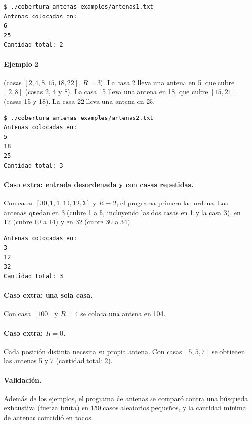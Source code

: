\documentclass[11pt,a4paper]{article}
\begin{document}
\begin{verbatim}
$ ./cobertura_antenas examples/antenas1.txt
Antenas colocadas en:
6
25
Cantidad total: 2
\end{verbatim}

\paragraph{Ejemplo 2} (casas $[2, 4, 8, 15, 18, 22]$, $R = 3$). La casa 2 lleva una antena en 5, que cubre $[2, 8]$ (casas 2, 4 y 8). La casa 15 lleva una antena en 18, que cubre $[15, 21]$ (casas 15 y 18). La casa 22 lleva una antena en 25.

\begin{verbatim}
$ ./cobertura_antenas examples/antenas2.txt
Antenas colocadas en:
5
18
25
Cantidad total: 3
\end{verbatim}

\paragraph{Caso extra: entrada desordenada y con casas repetidas.} Con casas $[30, 1, 1, 10, 12, 3]$ y $R = 2$, el programa primero las ordena. Las antenas quedan en 3 (cubre 1 a 5, incluyendo las dos casas en 1 y la casa 3), en 12 (cubre 10 a 14) y en 32 (cubre 30 a 34).

\begin{verbatim}
Antenas colocadas en:
3
12
32
Cantidad total: 3
\end{verbatim}

\paragraph{Caso extra: una sola casa.} Con casa $[100]$ y $R = 4$ se coloca una antena en 104.

\paragraph{Caso extra: $R = 0$.} Cada posición distinta necesita su propia antena. Con casas $[5, 5, 7]$ se obtienen las antenas 5 y 7 (cantidad total: 2).

\paragraph{Validación.} Además de los ejemplos, el programa de antenas se comparó contra una búsqueda exhaustiva (fuerza bruta) en 150 casos aleatorios pequeños, y la cantidad mínima de antenas coincidió en todos.
\end{document}
